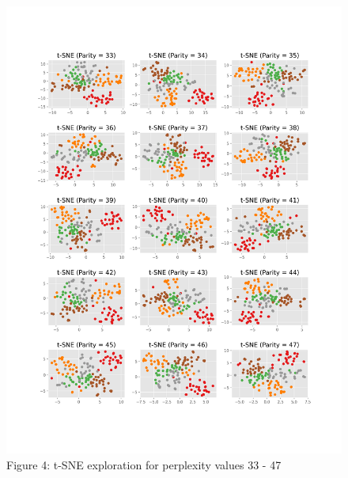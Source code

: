 \documentclass[12pt,article]{article}
\begin{document}
\begin{figure}[H]
\centering
\includegraphics[scale = 0.55]{images/sne_exploration3.png}    
\captionsetup{labelformat=empty}
\vspace{-75pt}
\caption{\scriptsize{Figure 4: t-SNE exploration for perplexity values 33 - 47}}
\end{figure}

\newpage
\end{document}
